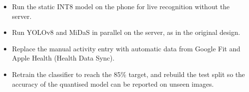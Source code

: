 

\begin{itemize}
  \item Run the static INT8 model on the phone for live recognition without the server.
  \item Run YOLOv8 and MiDaS in parallel on the server, as in the original design.
  \item Replace the manual activity entry with automatic data from Google Fit and
        Apple Health (Health Data Sync).
  \item Retrain the classifier to reach the 85\% target, and rebuild the test split
        so the accuracy of the quantised model can be reported on unseen images.
\end{itemize}
